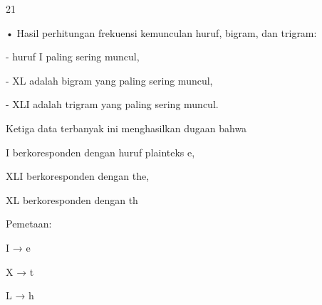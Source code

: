 \documentclass{article}
\begin{document}

21

• Hasil perhitungan frekuensi kemunculan huruf, bigram, dan trigram: 

  - huruf I paling sering muncul, 

 - XL adalah bigram yang paling sering muncul, 

  - XLI adalah trigram yang paling sering muncul. 

 Ketiga data terbanyak ini menghasilkan dugaan bahwa

    I  berkoresponden dengan huruf plainteks e, 

    XLI  berkoresponden dengan the, 

    XL berkoresponden dengan th

Pemetaan:

  I → e

  X → t

  L → h
\end{document}
